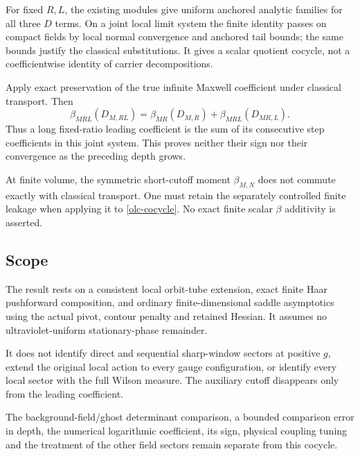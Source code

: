 For fixed $R,L$, the existing modules give uniform anchored
analytic families for all three $D$ terms. On a joint local
limit system the finite identity passes on compact fields
by local normal convergence and anchored tail bounds;
the same bounds justify the classical substitutions.
It gives a scalar quotient cocycle, not a coefficientwise
identity of carrier decompositions.

Apply exact preservation of the true infinite Maxwell
coefficient under classical transport. Then
\begin{equation}
 \beta_{MRL}(D_{M,RL})
   =\beta_{MR}(D_{M,R})+\beta_{MRL}(D_{MR,L}).
 \label{olc-Maxwell-cocycle}
\end{equation}
Thus a long fixed-ratio leading coefficient is the sum of
its consecutive step coefficients in this joint system.
This proves neither their sign nor their convergence as
the preceding depth grows.

At finite volume, the symmetric short-cutoff moment
$\beta_{M,N}$ does not commute exactly with classical
transport. One must retain the separately controlled
finite leakage when applying it to
\eqref{olc-cocycle}. No exact finite scalar
$\beta$ additivity is asserted.

\subsection{Scope}
\label{olc-scope-section}

The result rests on a consistent local orbit-tube extension,
exact finite Haar pushforward composition, and ordinary
finite-dimensional saddle asymptotics using the actual
pivot, contour penalty and retained Hessian. It assumes
no ultraviolet-uniform stationary-phase remainder.

It does not identify direct and sequential sharp-window
sectors at positive $g$, extend the original local action
to every gauge configuration, or identify every local
sector with the full Wilson measure. The auxiliary cutoff
disappears only from the leading coefficient.

The background-field/ghost determinant comparison, a
bounded comparison error in depth, the numerical
logarithmic coefficient, its sign, physical coupling
tuning and the treatment of the other field sectors
remain separate from this cocycle.
